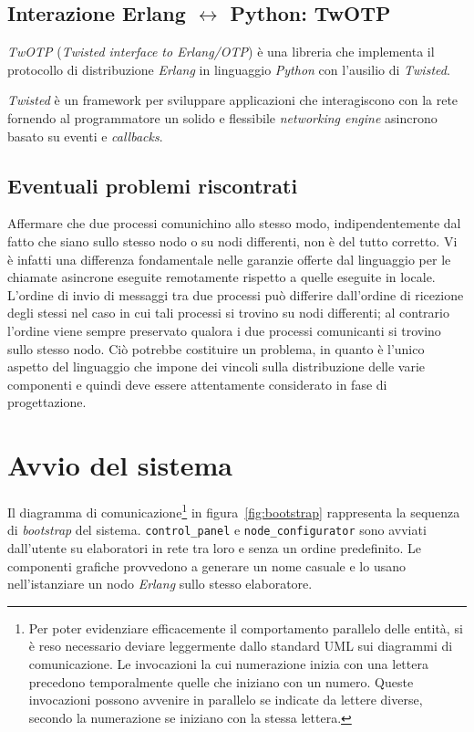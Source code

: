 \documentclass[a4paper]{report}
\newcommand{\Erlang}{\textsl{Erlang}}
\newcommand{\Python}{\textsl{Python}}
\begin{document}
\subsection*{Interazione Erlang $\leftrightarrow$ Python: TwOTP}
\textsl{TwOTP} (\textit{Twisted interface to Erlang/OTP}) è una libreria che implementa il protocollo di distribuzione \Erlang{} in linguaggio \Python{} con l'ausilio di \textsl{Twisted}.

\textsl{Twisted} è un framework per sviluppare applicazioni che interagiscono con la rete fornendo al programmatore un solido e flessibile \textit{networking engine} asincrono basato su eventi e \textit{callbacks}.

\subsection*{Eventuali problemi riscontrati}
Affermare che due processi comunichino allo stesso modo, indipendentemente dal fatto che siano sullo stesso nodo o su nodi differenti, non è del tutto corretto. Vi è infatti una differenza fondamentale nelle garanzie offerte dal linguaggio per le chiamate asincrone eseguite remotamente rispetto a quelle eseguite in locale. L'ordine di invio di messaggi tra due processi può differire dall'ordine di ricezione degli stessi nel caso in cui tali processi si trovino su nodi differenti; al contrario l'ordine viene sempre preservato qualora i due processi comunicanti si trovino sullo stesso nodo. Ciò potrebbe costituire un problema, in quanto è l'unico aspetto del linguaggio che impone dei vincoli sulla distribuzione delle varie componenti e quindi deve essere attentamente considerato in fase di progettazione.

\section{Avvio del sistema}
\label{sec:avvio}

Il diagramma di comunicazione\footnote{Per poter evidenziare efficacemente il comportamento parallelo delle entità, si è reso necessario deviare leggermente dallo standard UML sui diagrammi di comunicazione. Le invocazioni la cui numerazione inizia con una lettera precedono temporalmente quelle che iniziano con un numero. Queste invocazioni possono avvenire in parallelo se indicate da lettere diverse, secondo la numerazione se iniziano con la stessa lettera.} in figura~\ref{fig:bootstrap} rappresenta la sequenza di \textit{bootstrap} del sistema. \texttt{control\_panel} e \texttt{node\_configurator} sono avviati dall'utente su elaboratori in rete tra loro e senza un ordine predefinito. Le componenti grafiche provvedono a generare un nome casuale e lo usano nell'istanziare un nodo \Erlang{} sullo stesso elaboratore.
\end{document}
